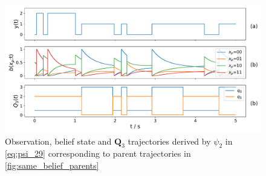 \begin{figure}[H]
	\begin{center}
		\includegraphics[width=.90\textwidth]{figures/equivalence_classes/same_belief/psi_29}
		\caption{Observation, belief state and $ \textbf{Q}_3 $ trajectories derived by $ \psi_2 $ in \autoref{eq:psi_29} corresponding to parent trajectories in \autoref{fig:same_belief_parents}}
		\label{fig:same_belief_psi_29}
	\end{center}
\end{figure}


